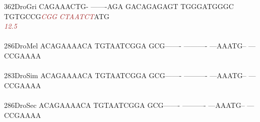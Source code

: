 \documentclass[11pt,twoside,reqno,a4paper]{article}
\begin{document}
{362\hspace*{1\charwidth}DroGri	CAGAAACTG-	-------AGA	GACAGAGAGT	TGGGATGGGC	TGTGCCG\textit{\textcolor{Brown}{C}}\textit{\textcolor{Brown}{G}}\textit{\textcolor{Brown}{G}}	\textit{\textcolor{Brown}{C}}\textit{\textcolor{Brown}{T}}\textit{\textcolor{Brown}{A}}\textit{\textcolor{Brown}{A}}\textit{\textcolor{Brown}{T}}\textit{\textcolor{Brown}{C}}\textit{\textcolor{Brown}{T}}ATG	\\
\hspace*{4\charwidth}\hspace*{7\charwidth}\hspace*{1\charwidth}\hspace*{1\charwidth}\hspace*{1\charwidth}\hspace*{1\charwidth}\hspace*{47\charwidth}\textit{\textcolor{Brown}{12.5}}\hspace*{1\charwidth}\hspace*{1\charwidth}\\
\\
286\hspace*{1\charwidth}DroMel	ACAGAAAACA	TGTAATCGGA	GCG-------	----------	---AAATG--	---CCGAAAA	\\
\hspace*{4\charwidth}\hspace*{7\charwidth}\hspace*{1\charwidth}\hspace*{1\charwidth}\hspace*{1\charwidth}\hspace*{1\charwidth}\hspace*{1\charwidth}\hspace*{1\charwidth}\\
283\hspace*{1\charwidth}DroSim	ACAGAAAACA	TGTAATCGGA	GCG-------	----------	---AAATG--	---CCGAAAA	\\
\hspace*{4\charwidth}\hspace*{7\charwidth}\hspace*{1\charwidth}\hspace*{1\charwidth}\hspace*{1\charwidth}\hspace*{1\charwidth}\hspace*{1\charwidth}\hspace*{1\charwidth}\\
286\hspace*{1\charwidth}DroSec	ACAGAAAACA	TGTAATCGGA	GCG-------	----------	---AAATG--	---CCGAAAA	\\
}
\end{document}
